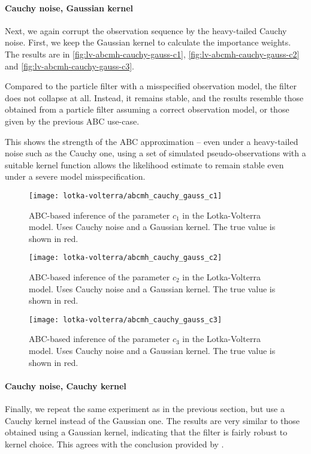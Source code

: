 \paragraph{Cauchy noise, Gaussian kernel}
Next, we again corrupt the observation sequence by the heavy-tailed Cauchy noise. First, we keep the Gaussian kernel to calculate the importance weights. The results are in \autoref{fig:lv-abcmh-cauchy-gauss-c1}, \autoref{fig:lv-abcmh-cauchy-gauss-c2} and \autoref{fig:lv-abcmh-cauchy-gauss-c3}.

Compared to the particle filter with a misspecified observation model, the filter does not collapse at all. Instead, it remains stable, and the results resemble those obtained from a particle filter assuming a correct observation model, or those given by the previous ABC use-case.

This shows the strength of the ABC approximation -- even under a heavy-tailed noise such as the Cauchy one, using a set of simulated pseudo-observations with a suitable kernel function allows the likelihood estimate to remain stable even under a severe model misspecification.

\begin{figure}[ht]
    \centering
    \texttt{[image: lotka-volterra/abcmh\_cauchy\_gauss\_c1]}
    \caption{ABC-based inference of the parameter $c_1$ in the Lotka-Volterra model. Uses Cauchy noise and a Gaussian kernel. The true value is shown in red.}
    \label{fig:lv-abcmh-cauchy-gauss-c1}
\end{figure}

\begin{figure}[ht]
    \centering
    \texttt{[image: lotka-volterra/abcmh\_cauchy\_gauss\_c2]}
    \caption{ABC-based inference of the parameter $c_2$ in the Lotka-Volterra model. Uses Cauchy noise and a Gaussian kernel. The true value is shown in red.}
    \label{fig:lv-abcmh-cauchy-gauss-c2}
\end{figure}

\begin{figure}[ht]
    \centering
    \texttt{[image: lotka-volterra/abcmh\_cauchy\_gauss\_c3]}
    \caption{ABC-based inference of the parameter $c_3$ in the Lotka-Volterra model. Uses Cauchy noise and a Gaussian kernel. The true value is shown in red.}
    \label{fig:lv-abcmh-cauchy-gauss-c3}
\end{figure}

\paragraph{Cauchy noise, Cauchy kernel}
Finally, we repeat the same experiment as in the previous section, but use a Cauchy kernel instead of the Gaussian one. The results are very similar to those obtained using a Gaussian kernel, indicating that the filter is fairly robust to kernel choice. This agrees with the conclusion provided by \cite{dedecius}.

